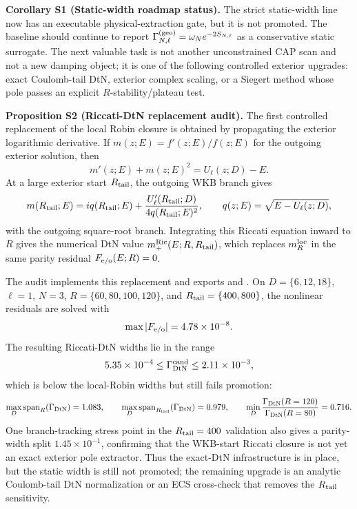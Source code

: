 \documentclass[aps,prd,onecolumn,notitlepage,nofootinbib,superscriptaddress,11pt,floatfix]{revtex4-2}
\begin{document}
\medskip\noindent\textbf{Corollary S1 (Static-width roadmap status).}
The strict static-width line now has an executable physical-extraction gate, but it is not promoted.  The baseline should continue to report \(\Gamma_{N,\ell}^{\rm(geo)}=\omega_N e^{-2S_{N,\ell}}\) as a conservative static surrogate.  The next valuable task is not another unconstrained CAP scan and not a new damping object; it is one of the following controlled exterior upgrades: exact Coulomb-tail DtN, exterior complex scaling, or a Siegert method whose pole passes an explicit \(R\)-stability/plateau test.

\medskip\noindent\textbf{Proposition S2 (Riccati-DtN replacement audit).}
The first controlled replacement of the local Robin closure is obtained by propagating the exterior logarithmic derivative.  If \(m(z;E)=f'(z;E)/f(z;E)\) for the outgoing exterior solution, then
\[
m'(z;E)+m(z;E)^2=U_\ell(z;D)-E.
\]
At a large exterior start \(R_{\rm tail}\), the outgoing WKB branch gives
\[
m(R_{\rm tail};E)
=i q(R_{\rm tail};E)+\frac{U_\ell'(R_{\rm tail};D)}{4q(R_{\rm tail};E)^2},
\qquad
q(z;E)=\sqrt{E-U_\ell(z;D)} ,
\]
with the outgoing square-root branch.  Integrating this Riccati equation inward to \(R\) gives the numerical DtN value \(m_+^{\rm Ric}(E;R,R_{\rm tail})\), which replaces \(m_R^{\rm loc}\) in the same parity residual \(F_{\rm e/o}(E;R)=0\).

The audit  implements this replacement and exports  and .  On \(D=\{6,12,18\}\), \(\ell=1\), \(N=3\), \(R=\{60,80,100,120\}\), and \(R_{\rm tail}=\{400,800\}\), the nonlinear residuals are solved with
\[
\max |F_{\rm e/o}|=4.78\times10^{-8}.
\]
The resulting Riccati-DtN widths lie in the range
\[
5.35\times10^{-4}\leq \Gamma_{\rm DtN}^{\rm cand}\leq 2.11\times10^{-3},
\]
which is below the local-Robin widths but still fails promotion:
\[
\max_D {\rm span}_R(\Gamma_{\rm DtN})=1.083,\qquad
\max_D {\rm span}_{R_{\rm tail}}(\Gamma_{\rm DtN})=0.979,\qquad
\min_D \frac{\Gamma_{\rm DtN}(R=120)}{\Gamma_{\rm DtN}(R=80)}=0.716 .
\]
One branch-tracking stress point in the \(R_{\rm tail}=400\) validation also gives a parity-width split \(1.45\times10^{-1}\), confirming that the WKB-start Riccati closure is not yet an exact exterior pole extractor.  Thus the exact-DtN infrastructure is in place, but the static width is still not promoted; the remaining upgrade is an analytic Coulomb-tail DtN normalization or an ECS cross-check that removes the \(R_{\rm tail}\) sensitivity.
\end{document}
